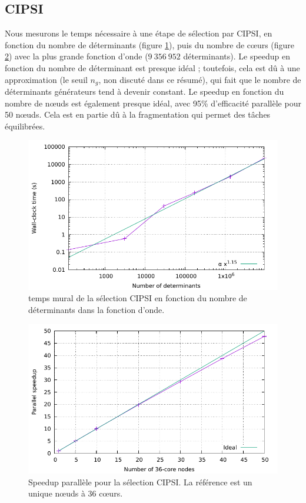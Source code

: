 \documentclass[./thesis.tex]{subfiles}
\begin{document}
\subsection{CIPSI}
Nous mesurons le temps nécessaire à une étape de sélection par CIPSI, en fonction du nombre de déterminants (figure \ref{fig:scaling_sel_ndet_fr}), puis du nombre de cœurs (figure \ref{fig:scaling_sel_node_fr}) avec la plus grande fonction d'onde ($9~356~952$ déterminants).
Le speedup en fonction du nombre de déterminant est presque idéal ; toutefois, cela est dû à une approximation (le seuil $n_g$, non discuté dans ce résumé), qui fait que le nombre de déterminants générateurs tend à devenir constant.
Le speedup en fonction du nombre de nœuds est également presque idéal, avec 95\% d'efficacité parallèle pour 50 nœuds. Cela est en partie dû à la fragmentation qui permet des tâches équilibrées.
\begin{figure}[h!]
    \begin{center}
      \includegraphics[width=0.8\columnwidth]{figures/perf/scaling_sel_det}
      \caption{temps mural de la sélection CIPSI en fonction du nombre de déterminants dans la fonction d'onde.}
      \label{fig:scaling_sel_ndet_fr}
    \end{center}
\end{figure}
\begin{figure}[h!]
    \begin{center}
      \includegraphics[width=0.8\columnwidth]{figures/perf/scaling_sel_node}
      \caption{Speedup parallèle pour la sélection CIPSI. La référence est un unique nœuds à 36 cœurs.}
      \label{fig:scaling_sel_node_fr}
    \end{center}
\end{figure}
\end{document}
